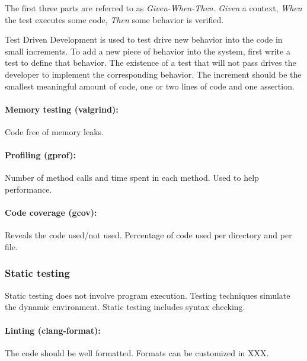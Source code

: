 \documentclass[12pt, titlepage]{article}
\begin{document}
The first three parts are referred to as {\it Given-When-Then}. {\it Given} a context, {\it When}
the test executes some code, {\it Then} some behavior is verified.

Test Driven Development is used to test drive new behavior into the code in small increments. To
add a new piece of behavior into the system, first write a test to define that behavior. The
existence of a test that will not pass drives the developer to implement the corresponding behavior.
The increment should be the smallest meaningful amount of code, one or two lines of code and one assertion.

\paragraph{Memory testing (valgrind):}
Code free of memory leaks.

\paragraph{Profiling (gprof):}
Number of method calls and time spent in each method. Used to help performance.

\paragraph{Code coverage (gcov):}
Reveals the code used/not used. Percentage of code used per directory and per file.

\subsubsection{Static testing}
Static testing does not involve program execution.
Testing techniques simulate the dynamic environment.
Static testing includes syntax checking.

\paragraph{Linting (clang-format):}
The code should be well formatted. Formats can be customized in XXX.
\end{document}
